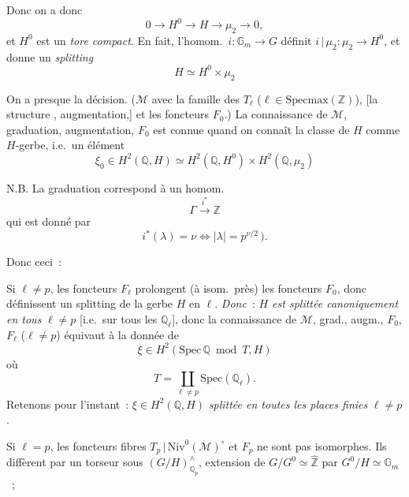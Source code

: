 \documentclass[11pt,a4paper]{article}
\begin{document}
Donc on a donc
\[
  0 \longrightarrow H^{0} \longrightarrow H \longrightarrow \mu_2 \longrightarrow 0 ,
\]
et $H^{0}$ est un \emph{tore compact}. En fait, l'homom.\ $i \colon \mathbb{G}_m \to G$ définit
$i \,|\, \mu_2 \colon \mu_2 \to H^{0}$, et donne un \emph{splitting}
\[
  H \simeq H^{0} \times \mu_2
\]

On a presque la décision. ($\mathcal{M}$ avec la famille des \struck{\ill{}}
$T_\ell$ ($\ell \in \mathrm{Specmax}(\mathbb{Z})$),
[la structure , augmentation,]  et les
foncteurs $F_0$.) La connaissance de $\mathcal{M}$, graduation, augmentation, $F_0$ est connue quand on connaît la
classe de $H$ comme $H$-gerbe, i.e.\ un élément
\[
  \xi_0 \in H^2(\mathbb{Q}, H) \simeq H^2(\mathbb{Q}, H^{0}) \times H^2(\mathbb{Q}, \mu_2)
\]

N.B. La graduation correspond à un homom.
\[
  \Gamma \xrightarrow{\;i^{*}\;} \mathbb{Z}
\]
qui est donné par
\[
  i^{*}(\lambda) = \nu \iff |\lambda| = p^{\nu/2} \,).
\]

Donc ceci~:

Si $\ell \neq p$, les foncteurs $F_\ell$ prolongent (à isom.\ près) les foncteurs $F_0$, donc \struck{\ill{}}
définissent un splitting de la gerbe $H$ en $\ell$. \emph{Donc}~: \emph{$H$ est splittée
canoniquement en tous} $\ell \neq p$ [i.e.\ sur tous les $\mathbb{Q}_\ell$], donc la connaissance de
 $\mathcal{M}$, grad., augm., $F_0$, $F_\ell$ ($\ell \neq p$) équivaut à la donnée de
\[
  \xi \in H^2(\mathrm{Spec}\, \mathbb{Q} \bmod T, H)
\]
où
\[
  T = \coprod_{\ell \neq p} \mathrm{Spec}(\mathbb{Q}_\ell).
\]
Retenons pour l'instant~: $\xi \in H^2(\mathbb{Q}, H)$ \emph{splittée en toutes les places finies}
$\ell \neq p$.

Si $\ell = p$, les foncteurs fibres $T_p \,|\, \mathrm{Niv}^0(\mathcal{M})^{\circ}$ et $F_p$ ne sont pas
isomorphes. Ils diffèrent par un torseur sous $(G/H)^{\wedge}_{\mathbb{Q}_p}$, extension de
$G/G^{0} \simeq \widehat{\mathbb{Z}}$ par $G^{0}/H \simeq \mathbb{G}_m$~;
\end{document}
